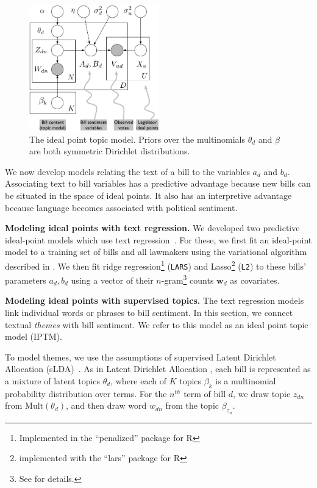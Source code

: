 \begin{figure}[t]
\center
\includegraphics[width=0.5\textwidth]{chapter_predicting_votes_with_text/figures/ideal-point-topic-model.pdf}
\caption{The ideal point topic model.  Priors over the multinomials
$\theta_d$ and $\beta$ are both symmetric Dirichlet distributions.}
\label{fig:legis_gm}
\end{figure}

We now develop models relating the text of a bill to the variables
$a_d$ and $b_d$.  Associating text to bill variables has a predictive
advantage because new bills can be situated in the space of ideal
points.  It also has an interpretive advantage because language
becomes associated with political sentiment.

\textbf{Modeling ideal points with text regression.} We developed two
predictive ideal-point models which use text
regression~\citep{kogan:2009}.  For these, we first fit an ideal-point
model to a training set of bills and all lawmakers using the
variational algorithm described in .  We then fit ridge
regression\footnote{Implemented in the ``penalized'' package for R}
(\verb!LARS!) and Lasso\footnote{implemented with the ``lars'' package
  for R} (\verb!L2!) to these bills' parameters $a_d, b_d$ using a
vector of their $n$-gram\footnote{See  for
  details.}  counts $\bm w_{d}$ as covariates.

\textbf{Modeling ideal points with supervised topics.} The text
regression models link individual words or phrases to bill sentiment.
In this section, we connect textual \emph{themes} with bill sentiment.
We refer to this model as an ideal point topic model (IPTM).

To model themes, we use the assumptions of supervised Latent Dirichlet
Allocation (sLDA)~\citep{blei:2008}.  As in Latent Dirichlet Allocation
\citep{blei:2003}, each bill is represented as a mixture of latent
topics $\theta_d$, where each of $K$ topics $\beta_k$ is a multinomial
probability distribution over terms.  For the $n^{th}$ term of bill
$d$, we draw topic $z_{dn}$ from $\mbox{Mult}(\theta_d)$, and then
draw word $w_{dn}$ from the topic $\beta_{z_n}$.

